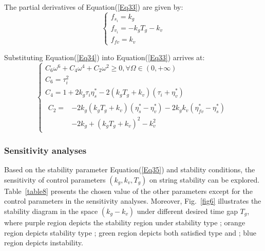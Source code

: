 \documentclass[journal]{IEEEtran}
\begin{document}
The partial derivatives of Equation(\ref{Eq33}) are given by:
\begin{equation}
  \left\{\begin{array}{l}
    f_{s_{i}}=k_{g}              \\
    f_{v_{i}}=-k_{g} T_{g}-k_{v} \\
    f_{f v}=k_{v}
  \end{array}\right.
  \label{Eq34}
\end{equation}

Substituting Equation(\ref{Eq34}) into Equation(\ref{Eq33}) arrives at:
\begin{equation}
  \left\{\begin{array}{l}
    C_{6} \omega^{6}+C_{4} \omega^{4}+C_{2} \omega^{2} \geq 0, \forall \Omega \in(0,+\infty)                \\
    C_{6}=\tau_{i}^{2}                                                                                      \\
    C_{4}=1+2 k_{g} \tau_{i} \eta_{s}^{*}-2\left(k_{g} T_{g}+k_{v}\right)\left(\tau_{i}+\eta_{v}^{*}\right) \\
    \begin{aligned}
      C_{2}= & -2 k_{g}\left(k_{g} T_{g}+k_{v}\right)\left(\eta_{s}^{*}-\eta_{v}^{*}\right)-2 k_{g} k_{v}\left(\eta_{f v}^{*}-\eta_{s}^{*}\right) \\
             & -2 k_{g}+\left(k_{g} T_{g}+k_{v}\right)^{2}-k_{v}^{2}
    \end{aligned}
  \end{array}\right.
  \label{Eq35}
\end{equation}

\subsubsection{Sensitivity analyses}
\label{Section 4.3.4}

Based on the stability parameter Equation(\ref{Eq35}) and stability conditions, the sensitivity of control parameters $(k_g,k_v,T_g)$ on string stability can be explored. Table~\ref{table8} presents the chosen value of the other parameters except for the control parameters in the sensitivity analyses. Moreover, Fig.~\ref{fig6} illustrates the stability diagram in the space $(k_g-k_v)$ under different desired time gap $T_g$, where purple region depicts the stability region under stability type \uppercase\expandafter{}; orange region depicts stability type \uppercase\expandafter{}; green region depicts both satisfied type \uppercase\expandafter{} and \uppercase\expandafter{}; blue region depicts instability.
\end{document}

